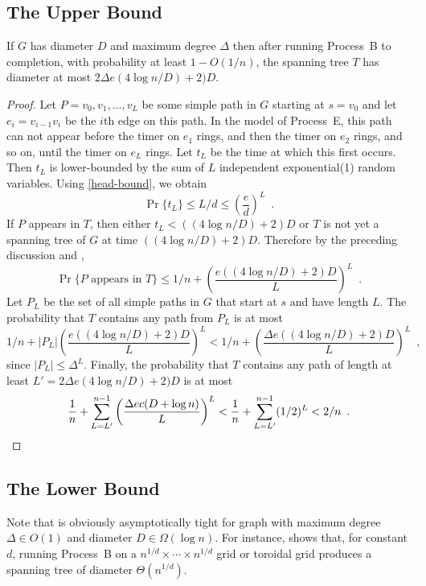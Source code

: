 \documentclass{patmorin}
\begin{document}
\subsection{The Upper Bound}

\begin{thm}
  If $G$ has diameter $D$ and maximum degree $\Delta$ then after running
  Process~B to completion, with probability at least $1-O(1/n)$, the spanning
  tree $T$ has diameter at most $2\Delta e(4\log n/D)+2)D$.
\end{thm}

\begin{proof}
  Let $P=v_0,v_1,\ldots,v_L$ be some simple path in $G$ starting at
  $s=v_0$ and let $e_i=v_{i-1}v_i$ be the $i$th edge on this path.
  In the model of Process~E, this path can not appear before the timer
  on $e_1$ rings, and then the timer on $e_2$ rings, and so on, until the
  timer on $e_L$ rings.  Let $t_L$ be the time at which this first occurs.
  Then $t_L$ is lower-bounded by the sum of $L$ independent exponential(1)
  random variables.  Using \eqref{head-bound}, we obtain
  \[
      \Pr\{t_L\} \le L/d \le \left(\frac{e}{d}\right)^L \enspace .
  \]
  If $P$ appears in $T$, then either $t_L < ((4\log n/D)+2)D$ or $T$ is not
  yet a spanning tree of $G$ at time $((4\log n/D)+2)D$.  
  Therefore by the preceding discussion and , 
  \[
      \Pr\{\text{$P$ appears in $T$}\} \le 1/n 
        + \left(\frac{e((4\log n/D)+2)D}{L}\right)^L \enspace .
  \]
  Let $P_L$ be the set of all simple paths in $G$ that start at $s$ and have length $L$.  The probability that $T$ contains any path from $P_L$ is at most
  \[
      1/n + |P_L|\left(\frac{e((4\log n/D)+2)D}{L}\right)^L 
      < 1/n + \left(\frac{\Delta e((4\log n/D)+2)D}{L}\right)^L \enspace ,
  \]
  since $|P_L|\le \Delta^L$.
  Finally, the probability that $T$ contains any path of length at least
  $L'=2\Delta e(4\log n/D)+2)D$ is at most
  \[
     \frac{1}{n}+\sum_{L=L'}^{n-1} \left(\frac{\Delta ec(D+\log n)}{L}\right)^L <  \frac{1}{n}+\sum_{L=L'}^{n-1} (1/2)^L < 2/n \enspace . \qedhere
  \]
\end{proof}



\subsection{The Lower Bound}

Note that  is obviously asymptotically
tight for graph with maximum degree $\Delta\in O(1)$ and diameter
$D\in\Omega(\log n)$.  For instance, 
shows that, for constant $d$, running Process~B on a $n^{1/d}\times
\cdots\times n^{1/d}$ grid or toroidal grid produces a
spanning tree of diameter $\Theta(n^{1/d})$.
\end{document}
